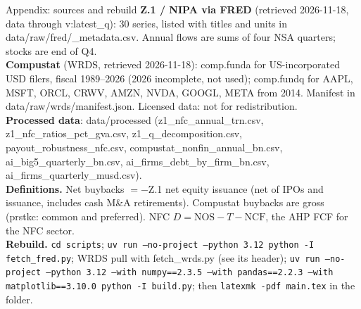 \documentclass[aspectratio=169,10pt,t]{beamer}
\newcommand{\val}[1]{\csname v:#1\endcsname}
\begin{document}
\begin{frame}{Appendix: sources and rebuild}
\vspace{0.1cm}
{\scriptsize
\textbf{Z.1 / NIPA via FRED} (retrieved 2026-11-18, data through \val{latest_q}): 30 series, listed with titles and units in data/raw/fred/\_metadata.csv. Annual flows are sums of four NSA quarters; stocks are end of Q4.\\[0.12cm]
\textbf{Compustat} (WRDS, retrieved 2026-11-18): comp.funda for US-incorporated USD filers, fiscal 1989--2026 (2026 incomplete, not used); comp.fundq for AAPL, MSFT, ORCL, CRWV, AMZN, NVDA, GOOGL, META from 2014. Manifest in data/raw/wrds/manifest.json. Licensed data: not for redistribution.\\[0.12cm]
\textbf{Processed data}: data/processed (z1\_nfc\_annual\_trn.csv, z1\_nfc\_ratios\_pct\_gva.csv, z1\_q\_decomposition.csv, payout\_robustness\_nfc.csv, compustat\_nonfin\_annual\_bn.csv, ai\_big5\_quarterly\_bn.csv, ai\_firms\_debt\_by\_firm\_bn.csv, ai\_firms\_quarterly\_musd.csv).\\[0.12cm]
\textbf{Definitions.} Net buybacks $=-$Z.1 net equity issuance (net of IPOs and issuance, includes cash M\&A retirements). Compustat buybacks are gross (prstkc: common and preferred). NFC $D=\mathrm{NOS}-T-\mathrm{NCF}$, the AHP FCF for the NFC sector.\\[0.12cm]
\textbf{Rebuild.} \texttt{cd scripts}; \texttt{uv run --no-project --python 3.12 python -I fetch\_fred.py}; WRDS pull with fetch\_wrds.py (see its header); \texttt{uv run --no-project --python 3.12 --with numpy==2.3.5 --with pandas==2.2.3 --with matplotlib==3.10.0 python -I build.py}; then \texttt{latexmk -pdf main.tex} in the folder.}
\end{frame}
\end{document}
